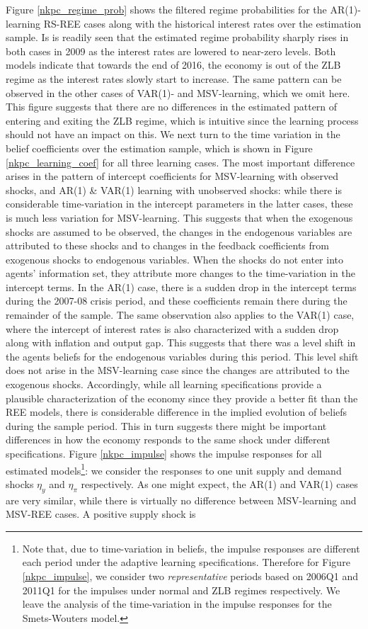 \documentclass[12pt,reqno]{article}
\numberwithin{equation}{section}
\begin{document}
Figure \ref{nkpc_regime_prob} shows the filtered regime probabilities for the AR(1)-learning RS-REE cases along with the historical interest rates over the estimation sample. Is is readily seen that the estimated regime probability sharply rises in both cases in 2009 as the interest rates are lowered to near-zero levels. Both models indicate that towards the end of 2016, the economy is out of the ZLB regime as the interest rates slowly start to increase. The same pattern can be observed in the other cases of VAR(1)- and MSV-learning, which we omit here. This figure suggests that there are no differences in the estimated pattern of entering and exiting the ZLB regime, which is intuitive since the learning process should not have an impact on this. We next turn to the time variation in the belief coefficients over the estimation sample, which is shown in Figure \ref{nkpc_learning_coef} for all three learning cases. The most important difference arises in the pattern of intercept coefficients for MSV-learning with observed shocks, and AR(1) \& VAR(1) learning with unobserved shocks: while there is considerable time-variation in the intercept parameters in the latter cases, these is much less variation for MSV-learning. This suggests that when the exogenous shocks are assumed to be observed, the changes in the endogenous variables are attributed to these shocks and to changes in the feedback coefficients from exogenous shocks to endogenous variables. When the shocks do not enter into agents' information set, they attribute more changes to the time-variation in the intercept terms. In the AR(1) case, there is a sudden drop in the intercept terms during the 2007-08 crisis period, and these coefficients remain there during the remainder of the sample. The same observation also applies to the VAR(1) case, where the intercept of interest rates is also characterized with a sudden drop along with inflation and output gap. This suggests that there was a level shift in the agents beliefs for the endogenous variables during this period. This level shift does not arise in the MSV-learning case since the changes are attributed to the exogenous shocks. Accordingly, while all learning specifications provide a plausible characterization of the economy since they provide a better fit than the REE models, there is considerable difference in the implied evolution of beliefs during the sample period. This in turn suggests there might be important differences in how the economy responds to the same shock under different specifications.  Figure \ref{nkpc_impulse} shows the impulse responses for all estimated models\footnote{Note that, due to time-variation in beliefs, the impulse responses are different each period under the adaptive learning specifications. Therefore for Figure \ref{nkpc_impulse}, we consider two \textit{representative} periods based on 2006Q1 and 2011Q1 for the impulses under normal and ZLB regimes respectively. We leave the analysis of the time-variation in the impulse responses for the Smets-Wouters model.}: we consider the responses to one unit supply and demand shocks $\eta_y$ and $\eta_{\pi}$ respectively. As one might expect, the AR(1) and VAR(1) cases are very similar, while there is virtually no difference between MSV-learning and MSV-REE cases. A positive supply shock is 
\end{document}
